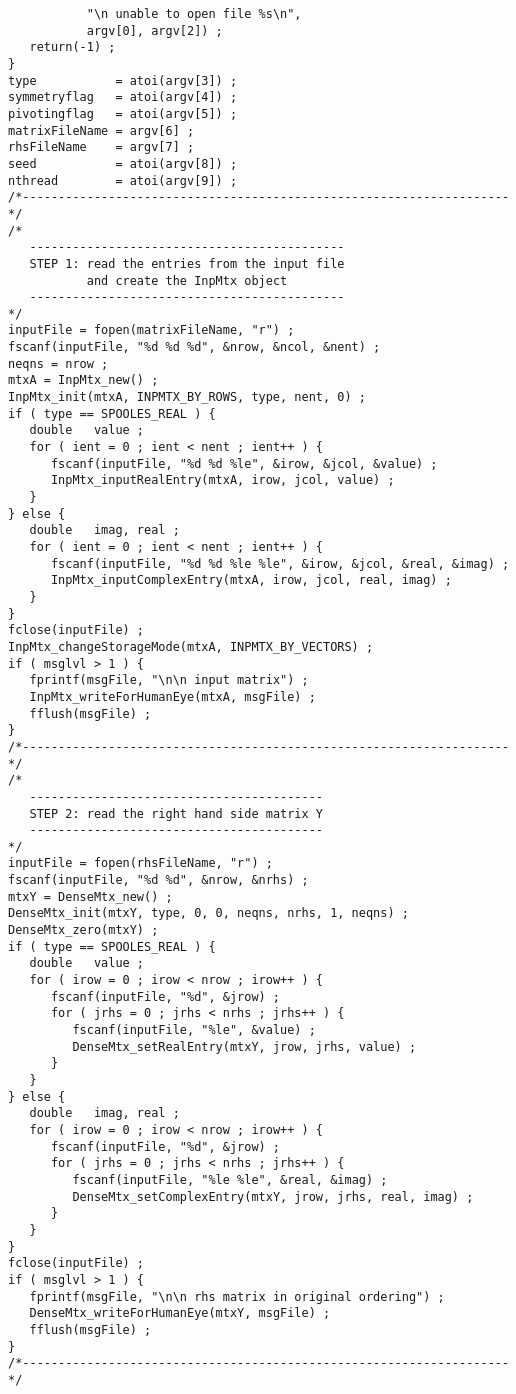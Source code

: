 \begin{verbatim}
           "\n unable to open file %s\n",
           argv[0], argv[2]) ;
   return(-1) ;
}
type           = atoi(argv[3]) ;
symmetryflag   = atoi(argv[4]) ;
pivotingflag   = atoi(argv[5]) ;
matrixFileName = argv[6] ;
rhsFileName    = argv[7] ;
seed           = atoi(argv[8]) ;
nthread        = atoi(argv[9]) ;
/*--------------------------------------------------------------------*/
/*
   --------------------------------------------
   STEP 1: read the entries from the input file 
           and create the InpMtx object
   --------------------------------------------
*/
inputFile = fopen(matrixFileName, "r") ;
fscanf(inputFile, "%d %d %d", &nrow, &ncol, &nent) ;
neqns = nrow ;
mtxA = InpMtx_new() ;
InpMtx_init(mtxA, INPMTX_BY_ROWS, type, nent, 0) ;
if ( type == SPOOLES_REAL ) {
   double   value ;
   for ( ient = 0 ; ient < nent ; ient++ ) {
      fscanf(inputFile, "%d %d %le", &irow, &jcol, &value) ;
      InpMtx_inputRealEntry(mtxA, irow, jcol, value) ;
   }
} else {
   double   imag, real ;
   for ( ient = 0 ; ient < nent ; ient++ ) {
      fscanf(inputFile, "%d %d %le %le", &irow, &jcol, &real, &imag) ;
      InpMtx_inputComplexEntry(mtxA, irow, jcol, real, imag) ;
   }
}
fclose(inputFile) ;
InpMtx_changeStorageMode(mtxA, INPMTX_BY_VECTORS) ;
if ( msglvl > 1 ) {
   fprintf(msgFile, "\n\n input matrix") ;
   InpMtx_writeForHumanEye(mtxA, msgFile) ;
   fflush(msgFile) ;
}
/*--------------------------------------------------------------------*/
/*
   -----------------------------------------
   STEP 2: read the right hand side matrix Y
   -----------------------------------------
*/
inputFile = fopen(rhsFileName, "r") ;
fscanf(inputFile, "%d %d", &nrow, &nrhs) ;
mtxY = DenseMtx_new() ;
DenseMtx_init(mtxY, type, 0, 0, neqns, nrhs, 1, neqns) ;
DenseMtx_zero(mtxY) ;
if ( type == SPOOLES_REAL ) {
   double   value ;
   for ( irow = 0 ; irow < nrow ; irow++ ) {
      fscanf(inputFile, "%d", &jrow) ;
      for ( jrhs = 0 ; jrhs < nrhs ; jrhs++ ) {
         fscanf(inputFile, "%le", &value) ;
         DenseMtx_setRealEntry(mtxY, jrow, jrhs, value) ;
      }
   }
} else {
   double   imag, real ;
   for ( irow = 0 ; irow < nrow ; irow++ ) {
      fscanf(inputFile, "%d", &jrow) ;
      for ( jrhs = 0 ; jrhs < nrhs ; jrhs++ ) {
         fscanf(inputFile, "%le %le", &real, &imag) ;
         DenseMtx_setComplexEntry(mtxY, jrow, jrhs, real, imag) ;
      }
   }
}
fclose(inputFile) ;
if ( msglvl > 1 ) {
   fprintf(msgFile, "\n\n rhs matrix in original ordering") ;
   DenseMtx_writeForHumanEye(mtxY, msgFile) ;
   fflush(msgFile) ;
}
/*--------------------------------------------------------------------*/

\end{verbatim}
